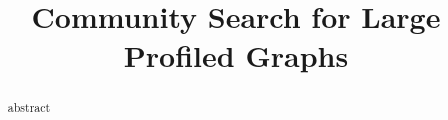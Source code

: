 \documentclass{vldb}
\begin{document}
\title{Community Search for Large Profiled Graphs}

\maketitle
\begin{abstract}
abstract
\end{abstract}






\clearpage

\vspace{0.99em}
\small{}
\end{document}
